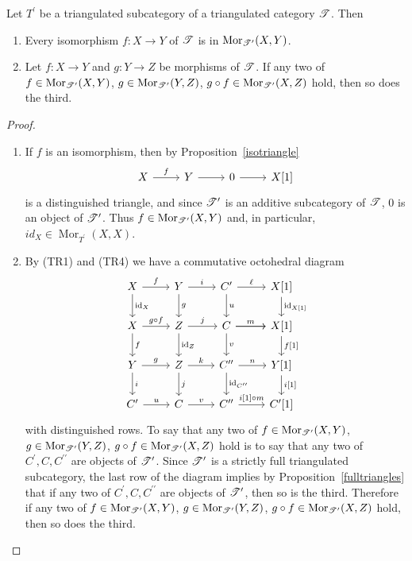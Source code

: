 \documentclass[dissertation.tex]{subfiles}
\begin{document}
\begin{lem}\label{moriscat}
  Let $T^\prime$ be a triangulated subcategory of a triangulated category $\mathscr{T}$.
  Then
  \begin{enumerate}
    \item
      Every isomorphism $f : X \rightarrow Y$ of $\mathscr{T}$ is in $\operatorname{Mor}_{\mathscr{T}^\prime}(X,Y)$.
    \item
      Let $f : X \rightarrow Y$ and $g : Y \rightarrow Z$ be morphisms of $\mathscr{T}$.
      If any two of 
      $f \in \operatorname{Mor}_{\mathscr{T}^\prime}(X,Y)$,
      $g \in \operatorname{Mor}_{\mathscr{T}^\prime}(Y,Z)$,
      $g \circ f \in \operatorname{Mor}_{\mathscr{T}^\prime}(X,Z)$
      hold, then so does the third. 
  \end{enumerate}
  
  \begin{proof}
    \begin{enumerate}
    \item
      If $f$ is an isomorphism, then by Proposition~\ref{isotriangle}
      $$\begin{tikzcd}
        X \arrow{r}{f} & Y \arrow{r} & 0 \arrow{r} & X[1]
      \end{tikzcd}$$
      is a distinguished triangle, and since $\mathscr{T}^\prime$ is an additive subcategory of $\mathscr{T}$, $0$ is an object of $\mathscr{T}^\prime$.
      Thus $f \in \operatorname{Mor}_{\mathscr{T}^\prime}(X,Y)$ and, in particular, $id_X \in \operatorname{Mor}_{T^\prime}(X,X)$.
    \item
      By (TR1) and (TR4) we have a commutative octohedral diagram
      $$\begin{tikzcd}
        X \arrow{r}{f}\arrow{d}{\id_X} & Y \arrow{r}{i}\arrow{d}{g} & C^\prime \arrow{r}{\ell}\arrow{d}{u} & X[1] \arrow{d}{\id_{X[1]}}\\
        X \arrow{r}{g \circ f}\arrow{d}{f} & Z\arrow{r}{j}\arrow{d}{\id_{Z}} & \arrow{r} C \arrow{r}{m}\arrow{d}{v} & X[1]\arrow{d}{f[1]}\\
        Y \arrow{r}{g}\arrow{d}{i} & Z \arrow{r}{k}\arrow{d}{j} & C^{\prime\prime}\arrow{d}{\id_{C^{\prime\prime}}} \arrow{r}{n} & Y[1]\arrow{d}{i[1]}\\
        C^\prime \arrow{r}{u} & C \arrow{r}{v} & C^{\prime\prime}\arrow{r}{i[1] \circ m} & C^\prime[1]
      \end{tikzcd}$$
      with distinguished rows.
      To say that any two of 
      $f \in \operatorname{Mor}_{\mathscr{T}^\prime}(X,Y)$,
      $g \in \operatorname{Mor}_{\mathscr{T}^\prime}(Y,Z)$,
      $g \circ f \in \operatorname{Mor}_{\mathscr{T}^\prime}(X,Z)$
      hold is to say that any two of $C^\prime, C, C^{\prime\prime}$ are objects of $\mathscr{T}^\prime$.
      Since $\mathscr{T}^\prime$ is a strictly full triangulated subcategory, the last row of the diagram implies by Proposition~\ref{fulltriangles} that if any two of $C^\prime, C, C^{\prime\prime}$ are objects of $\mathscr{T}^\prime$, then so is the third.
      Therefore if any two of 
      $f \in \operatorname{Mor}_{\mathscr{T}^\prime}(X,Y)$,
      $g \in \operatorname{Mor}_{\mathscr{T}^\prime}(Y,Z)$,
      $g \circ f \in \operatorname{Mor}_{\mathscr{T}^\prime}(X,Z)$
      hold, then so does the third.
    \end{enumerate}
  \end{proof}
\end{lem}
\end{document}
